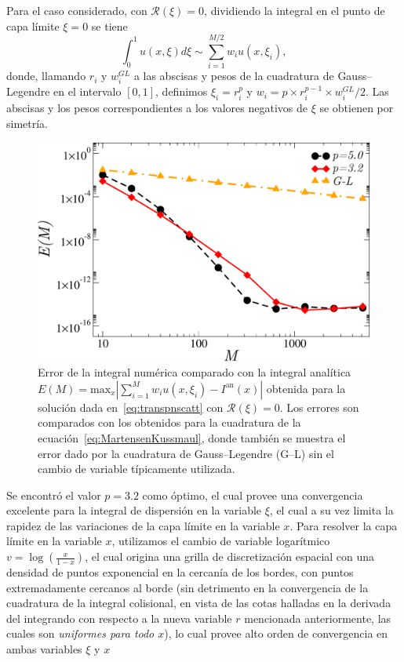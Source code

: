 Para el caso considerado, con $\mathcal{R}(\xi)=0$, 
dividiendo la integral en el punto de capa límite $\xi=0$ se tiene 
\begin{equation}
\int_{0}^{1} u(x,\xi) d\xi \sim \sum_{i=1}^{M/2} w_i u(x,\xi_i),
\label{eq:MartensenKussmaul}
\end{equation}
donde, llamando $r_i$ y $w_i^{GL}$ a las abscisas y pesos de la 
cuadratura de Gauss--Legendre en el intervalo $[0,1]$, 
definimos $\xi_i=r_i^p$ y $w_i= p \times r_i^{p-1} \times w_i^{GL}/2$. 
Las abscisas y los pesos correspondientes a los valores negativos 
de $\xi$ se obtienen por simetría. 
\begin{figure}[h!]
\centering
  \includegraphics[width=0.5\linewidth]{figuras/quads.pdf}
  \caption{Error de la integral numérica comparado con la integral 
  analítica $E(M)=\text{max}_x |\sum_{i=1}^M w_i u(x,\xi_i)-I^{\text{an}}(x)|$
  obtenida para la solución dada en~\eqref{eq:transpnscatt} con $\mathcal{R}(\xi)=0$. 
  Los errores son comparados con los obtenidos para la cuadratura 
  de la ecuación~\eqref{eq:MartensenKussmaul}, donde 
  también se muestra el error dado por la cuadratura de  Gauss--Legendre
    (G--L) sin el cambio de variable típicamente utilizada.}
 \label{fig:intconvs}
\end{figure}
Se encontró el valor $p=3.2$ como óptimo, el cual 
provee una convergencia excelente para la integral 
de dispersión en la variable $\xi$, el cual a su vez limita la rapidez 
de las variaciones de la capa límite en la variable $x$. 
Para resolver la capa límite en la variable $x$, utilizamos 
el cambio de variable logarítmico $v=\log(\frac{x}{1-x})$, 
el cual origina una grilla de discretización espacial con una 
densidad de puntos exponencial en la cercanía de los bordes, 
con puntos extremadamente cercanos al borde (sin detrimento 
en la convergencia de la cuadratura de la integral colisional, 
en vista de las cotas halladas en la derivada del 
integrando con respecto a la nueva variable $r$ mencionada 
anteriormente, las cuales son {\em uniformes para todo $x$}), 
lo cual provee alto orden de convergencia en ambas variables $\xi$ y $x$

